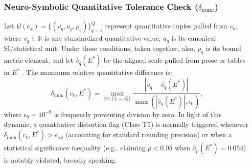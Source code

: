 \documentclass[sigconf]{acmart}
\begin{document}
\subsubsection{Neuro-Symbolic Quantitative Tolerance Check (\texorpdfstring{$\delta_{\text{num:}}$}{delta num})}
Let $\mathcal{Q}(c_k) = \{(v_q, u_q, \rho_q)\}_{q=1}^{Q}$ represent quantitative tuples pulled from $c_k$, where $v_q \in \mathbb{R}$ is any standardized quantitative value, $u_q$ is its canonical SI/statistical unit. Under these conditions, taken together, also, $\rho_q$ is its bound metric element, and let $\hat{v}_q(E^*)$ be the aligned scale pulled from prose or tables in $E^*$ \cite{herzig2020tapas,lu2023scitab}. The maximum relative quantitative difference is:
\begin{equation}
\delta_{\text{num}}(c_k, E^*) = \max_{q \in \{1, \dots, Q\}} \frac{|v_q - \hat{v}_q(E^*)|}{\max(|\hat{v}_q(E^*)|, \epsilon_0)},
\label{eq:num_check}
\end{equation}
where $\epsilon_0 = 10^{-8}$ is frequently preventing division by zero. In light of this dynamic, a quantitative distortion flag (Class T5) is normally triggered whenever $\delta_{\text{num}}(c_k, E^*) > \epsilon_{\text{tol}}$ (accounting for standard rounding precision) or when a statistical significance inequality (e.g., claiming $p < 0.05$ when $\hat{v}_p(E^*) = 0.054$) is notably violated, broadly speaking.
\end{document}
